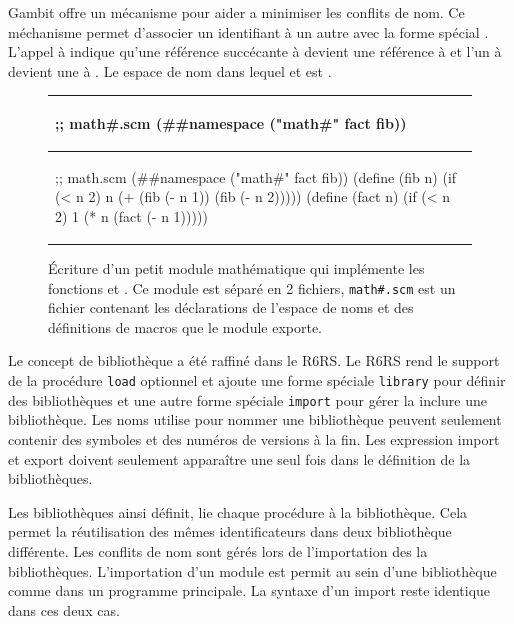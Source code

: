 Gambit offre un mécanisme pour aider a minimiser les conflits de nom. Ce
méchanisme permet d'associer un identifiant à un autre avec la forme spécial
.  L'appel à  indique
qu'une référence succécante à  devient une référence à
 et l'un à  devient une à . Le espace
de nom dans lequel  et  est .

\begin{center}
  \begin{figure}[h]
  \begin{tabular}{|l|}
\hline
\begin{mplisting}{0.5}
;; math#.scm
(##namespace ("math#" fact fib))
\end{mplisting} \\\hline
\begin{mplisting}{0.6}
;; math.scm
(##namespace ("math#" fact fib))
(define (fib n)
  (if (< n 2)
    n
    (+ (fib (- n 1)) (fib (- n 2)))))
(define (fact n)
  (if (< n 2)
    1
    (* n (fact (- n 1)))))
\end{mplisting}\\\hline
  \end{tabular}
  \caption{Écriture d'un petit module mathématique qui implémente les fonctions 
    et . Ce module est séparé en 2 fichiers, \texttt{math\#.scm} est un fichier
    contenant les déclarations de l'espace de noms et des définitions de macros que le module
    exporte.}
  \label{fig:math_module1}
\end{figure}
\end{center}


Le concept de bibliothèque a été raffiné  dans le R6RS.  Le R6RS rend le
support de la procédure \texttt{load} optionnel et ajoute une forme spéciale
\texttt{library} pour définir des bibliothèques et une autre forme spéciale
\texttt{import} pour gérer la inclure une bibliothèque.  Les noms utilise
pour nommer une bibliothèque peuvent seulement contenir des symboles et des
numéros de versions à la fin. Les expression import et export doivent seulement
apparaître une seul fois dans le définition de la bibliothèques.

Les bibliothèques ainsi définit, lie chaque procédure à la bibliothèque.  Cela
permet la réutilisation des mêmes identificateurs dans deux bibliothèque
différente.  Les conflits de nom sont gérés lors de l'importation des la
bibliothèques. L'importation d'un module est permit au sein d'une bibliothèque
comme dans un programme principale. La syntaxe d'un import reste identique dans
ces deux cas.


